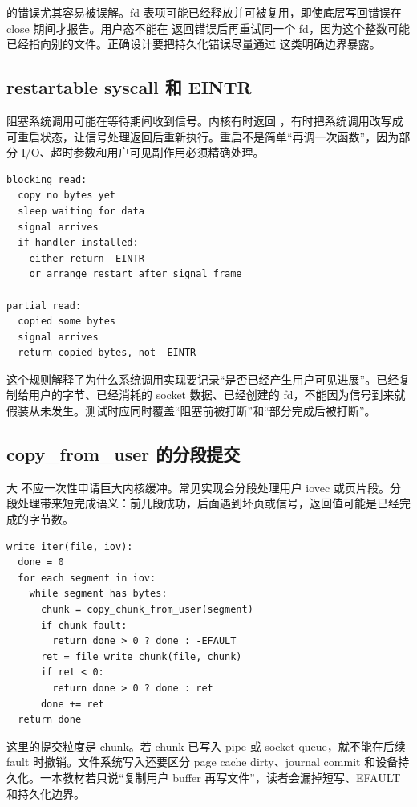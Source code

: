  的错误尤其容易被误解。fd 表项可能已经释放并可被复用，即使底层写回错误在 close 期间才报告。用户态不能在  返回错误后再重试同一个 fd，因为这个整数可能已经指向别的文件。正确设计要把持久化错误尽量通过  这类明确边界暴露。

\subsection{restartable syscall 和 EINTR}

阻塞系统调用可能在等待期间收到信号。内核有时返回 ，有时把系统调用改写成可重启状态，让信号处理返回后重新执行。重启不是简单“再调一次函数”，因为部分 I/O、超时参数和用户可见副作用必须精确处理。

\begin{lstlisting}
blocking read:
  copy no bytes yet
  sleep waiting for data
  signal arrives
  if handler installed:
    either return -EINTR
    or arrange restart after signal frame

partial read:
  copied some bytes
  signal arrives
  return copied bytes, not -EINTR
\end{lstlisting}

这个规则解释了为什么系统调用实现要记录“是否已经产生用户可见进展”。已经复制给用户的字节、已经消耗的 socket 数据、已经创建的 fd，不能因为信号到来就假装从未发生。测试时应同时覆盖“阻塞前被打断”和“部分完成后被打断”。

\subsection{copy\_from\_user 的分段提交}

大  不应一次性申请巨大内核缓冲。常见实现会分段处理用户 iovec 或页片段。分段处理带来短完成语义：前几段成功，后面遇到坏页或信号，返回值可能是已经完成的字节数。

\begin{lstlisting}
write_iter(file, iov):
  done = 0
  for each segment in iov:
    while segment has bytes:
      chunk = copy_chunk_from_user(segment)
      if chunk fault:
        return done > 0 ? done : -EFAULT
      ret = file_write_chunk(file, chunk)
      if ret < 0:
        return done > 0 ? done : ret
      done += ret
  return done
\end{lstlisting}

这里的提交粒度是 chunk。若 chunk 已写入 pipe 或 socket queue，就不能在后续 fault 时撤销。文件系统写入还要区分 page cache dirty、journal commit 和设备持久化。一本教材若只说“复制用户 buffer 再写文件”，读者会漏掉短写、EFAULT 和持久化边界。

